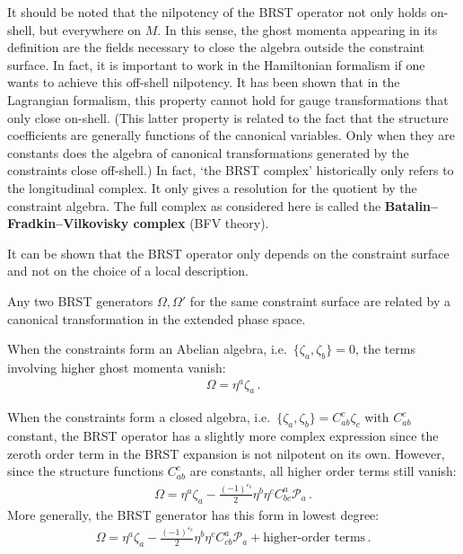     \begin{remark}
        It should be noted that the nilpotency of the BRST operator not only holds on-shell, but everywhere on $M$. In this sense, the ghost momenta appearing in its definition are the fields necessary to close the algebra outside the constraint surface. In fact, it is important to work in the Hamiltonian formalism if one wants to achieve this off-shell nilpotency. It has been shown that in the Lagrangian formalism, this property cannot hold for gauge transformations that only close on-shell. (This latter property is related to the fact that the structure coefficients are generally functions of the canonical variables. Only when they are constants does the algebra of canonical transformations generated by the constraints close off-shell.) In fact, `the BRST complex' historically only refers to the longitudinal complex. It only gives a resolution for the quotient by the constraint algebra. The full complex as considered here is called the \textbf{Batalin--Fradkin--Vilkovisky complex} (BFV theory).
    \end{remark}

    It can be shown that the BRST operator only depends on the constraint surface and not on the choice of a local description.
    \begin{property}[Uniqueness]
        Any two BRST generators $\Omega,\Omega'$ for the same constraint surface are related by a canonical transformation in the extended phase space.
    \end{property}

    \begin{example}
        When the constraints form an Abelian algebra, i.e.~$\{\zeta_a,\zeta_b\}=0$, the terms involving higher ghost momenta vanish:
        \begin{gather}
            \Omega = \eta^a\zeta_a\,.
        \end{gather}
    \end{example}
    \begin{example}
        When the constraints form a closed algebra, i.e.~$\{\zeta_a,\zeta_b\}=C^c_{ab}\zeta_c$ with $C^c_{ab}$ constant, the BRST operator has a slightly more complex expression since the zeroth order term in the BRST expansion is not nilpotent on its own. However, since the structure functions $C^c_{ab}$ are constants, all higher order terms still vanish:
        \begin{gather}
            \Omega = \eta^a\zeta_a -\frac{(-1)^{\varepsilon_b}}{2}\eta^b\eta^c C^a_{bc}\mathcal{P}_a\,.
        \end{gather}
        More generally, the BRST generator has this form in lowest degree:
        \begin{gather}
            \label{constraint:BRST_expansion}
            \Omega = \eta^a\zeta_a - \frac{(-1)^{\varepsilon_b}}{2}\eta^b\eta^cC^a_{cb}\mathcal{P}_a + \text{higher-order terms}\,.
        \end{gather}
    \end{example}

